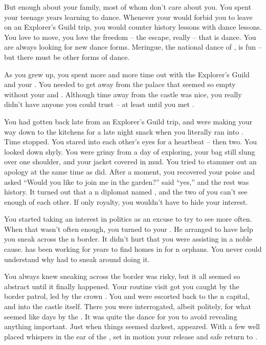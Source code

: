\documentclass[char]{NeptuneBall}
\begin{document}
But enough about your family, most of whom don't care about you. You spent your teenage years learning to dance. Whenever your \cKing{\parent} would forbid you to leave on an Explorer's Guild trip, you would counter \cKing{\them} history lessons with dance lessons.  You love to move, you love the freedom -- the escape, really -- that is dance. You are always looking for new dance forms. Meringue, the national dance of \pAtlantis{}, is fun -- but there must be other forms of dance.

As you grew up, you spent more and more time out with the Explorer's Guild and your \cPlant{\uncle}. You needed to get away from the palace that seemed so empty without your \cQueen{\parent} and \cAriel{\sibling}. Although time away from the castle was nice, you really didn't have anyone you could trust -- at least until you met \emph{\cDiplomat{\them}}.

You had gotten back late from an Explorer's Guild trip, and were making your way down to the kitchens for a late night snack when you literally ran into \emph{\cDiplomat{\them}}. Time stopped. You stared into each other's eyes for a heartbeat -- then two. You looked down shyly. You were grimy from a day of exploring, your bag still slung over one shoulder, and your jacket covered in mud. You tried to stammer out an apology at the same time as \cDiplomat{\they} did. After a moment, you recovered your poise and asked ``Would you like to join me in the garden?'' \cDiplomat{\They} said ``yes,'' and the rest was history.  It turned out that \cDiplomat{\they} \cDiplomat{\were} a \pPacifica{}n diplomat named \cDiplomat{}, and the two of you can't see enough of each other. If only \cDiplomat{\they} \cDiplomat{\were} royalty, you wouldn't have to hide your interest.

You started taking an interest in politics as an excuse to try to see \cDiplomat{\them} more often. When that wasn't often enough, you turned to your \cPlant{\uncle}. He arranged to have \cPriest{} help you sneak across  the \pPacifica{}n border. It didn't hurt that you were assisting in a noble cause. \cPriest{} has been working for years to find homes in \pPacifica{} for \pAtlantis{}n orphans. You never could understand why \cPriest{\they} had to sneak around doing it.

You always knew sneaking across the border was risky, but it all seemed so abstract until it finally happened. Your routine visit got you caught by the border patrol, led by the crown \cPrince{\Prince} \cPrince{\themself}. You and \cPriest{} were escorted back to the \pPacifica{}n capital, and into the castle itself. There you were interrogated, albeit politely, for what seemed like days by the \cPrince{\prince}. It was quite the dance for you to avoid revealing anything important. Just when things seemed darkest, \cDiplomat{} appeared. With a few well placed whispers in the ear of the \cPrince{\Prince}, \cDiplomat{\they} set in motion your release and safe return to \pAtlantis{}.
\end{document}
